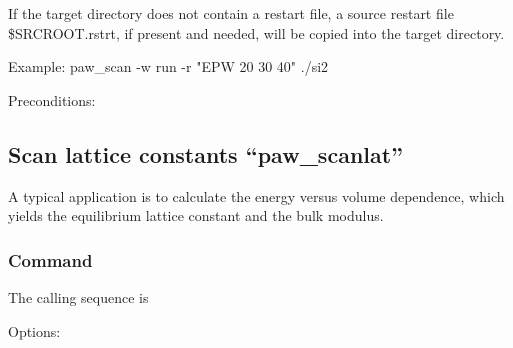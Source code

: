 \documentclass[final,12pt]{article}
\begin{document}
{{{{{{{\begin{minipage}{0.9\linewidth}
 If the target directory does not contain a restart file,
 a source restart file \$SRCROOT.rstrt, if present and needed,
 will be copied into the target directory.

 Example:
 	 paw\_scan -w run -r "EPW 20 30 40" ./si2
\end{minipage}}

\bigskip
\noindent Preconditions:\\[2mm]
\hspace*{1cm}
\bigskip
%
\subsection{Scan lattice constants ``paw\_scanlat''}
A typical application is to calculate the energy versus volume
dependence, which yields the equilibrium lattice constant and the bulk
modulus. 

\subsubsection{Command}
The calling sequence is

\bigskip{}
\vspace{0.5cm}

\noindent Options:\\[2mm]
\hspace*{1cm}\\
\bigskip

}}}}}}
\end{document}
